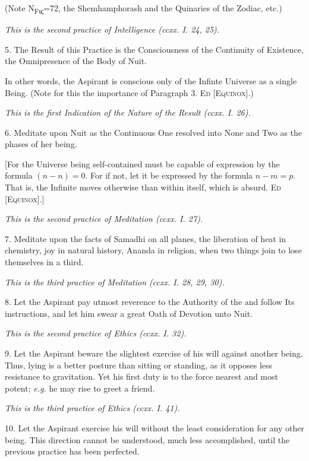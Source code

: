 (Note N\textsubscript{\textgreek{Fις}}=72, the Shemhamphorash and the Quinaries of the Zodiac, etc.)

\textit{This is the second practice of Intelligence (ccxx. I. 24, 25).}

5. The Result of this Practice is the Consciousness of the Continuity of Existence, the Omnipresence of the Body of Nuit.

In other words, the Aspirant is conscious only of the Infinte Universe as a single Being. (Note for this the importance of Paragraph 3. \textsc{Ed [Equinox]}.)

\textit{This is the first Indication of the Nature of the Result (ccxx. I. 26).}

6. Meditate upon Nuit as the Continuous One resolved into None and Two as the phases of her being.

[For the Universe being self-contained must be capable of expression by the formula $(n-n)=0$. For if not, let it be expressed by the formula $n-m=p$. That is, the Infinite moves otherwise than within itself, which is absurd. \textsc{Ed [Equinox]}.]

\textit{This is the second practice of Meditation (ccxx. I. 27).}

7. Meditate upon the facts of Samadhi on all planes, the liberation of heat in chemistry, joy in natural history, Ananda in religion, when two things join to lose themselves in a third.

\textit{This is the third practice of Meditation (ccxx. I. 28, 29, 30).}

8. Let the Aspirant pay utmost reverence to the Authority of the \Argentium{} and follow Its instructions, and let him swear a great Oath of Devotion unto Nuit.

\textit{This is the second practice of Ethics (ccxx. I. 32).}

9. Let the Aspirant beware the slightest exercise of his will against another being. Thus, lying is a better posture than sitting or standing, as it opposes less resistance to gravitation. Yet his first duty is to the force nearest and most potent; \textit{e.g.} he may rise to greet a friend.

\textit{This is the third practice of Ethics (ccxx. I. 41).}

10. Let the Aspirant exercise his will without the least consideration for any other being. This direction cannot be understood, much less accomplished, until the previous practice has been perfected.

